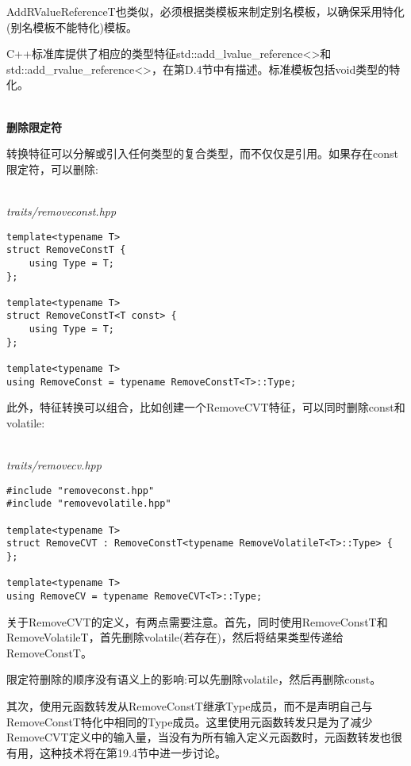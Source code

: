AddRValueReferenceT也类似，必须根据类模板来制定别名模板，以确保采用特化(别名模板不能特化)模板。

C++标准库提供了相应的类型特征std::add\_lvalue\_reference<>和std::add\_rvalue\_reference<>，在第D.4节中有描述。标准模板包括void类型的特化。

\hspace*{\fill} \\ %
\noindent
\textbf{删除限定符}

转换特征可以分解或引入任何类型的复合类型，而不仅仅是引用。如果存在const限定符，可以删除:

\hspace*{\fill} \\ %
\noindent
\textit{traits/removeconst.hpp}
\begin{lstlisting}[style=styleCXX]
template<typename T>
struct RemoveConstT {
	using Type = T;
};

template<typename T>
struct RemoveConstT<T const> {
	using Type = T;
};

template<typename T>
using RemoveConst = typename RemoveConstT<T>::Type;
\end{lstlisting}

此外，特征转换可以组合，比如创建一个RemoveCVT特征，可以同时删除const和volatile:

\hspace*{\fill} \\ %
\noindent
\textit{traits/removecv.hpp}
\begin{lstlisting}[style=styleCXX]
#include "removeconst.hpp"
#include "removevolatile.hpp"

template<typename T>
struct RemoveCVT : RemoveConstT<typename RemoveVolatileT<T>::Type> {
};

template<typename T>
using RemoveCV = typename RemoveCVT<T>::Type;
\end{lstlisting}

关于RemoveCVT的定义，有两点需要注意。首先，同时使用RemoveConstT和RemoveVolatileT，首先删除volatile(若存在)，然后将结果类型传递给RemoveConstT。

\begin{tcolorbox}[colback=webgreen!5!white,colframe=webgreen!75!black]
\hspace*{0.75cm}限定符删除的顺序没有语义上的影响:可以先删除volatile，然后再删除const。
\end{tcolorbox}

其次，使用元函数转发从RemoveConstT继承Type成员，而不是声明自己与RemoveConstT特化中相同的Type成员。这里使用元函数转发只是为了减少RemoveCVT定义中的输入量，当没有为所有输入定义元函数时，元函数转发也很有用，这种技术将在第19.4节中进一步讨论。

